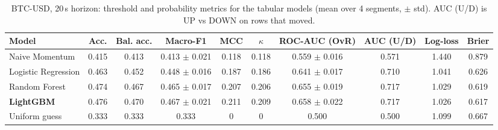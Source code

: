 \begin{table}[H]
\centering\scriptsize
\setlength{\tabcolsep}{3.5pt}
\caption{BTC-USD, 20\,s horizon: threshold and probability metrics for the tabular models (mean over 4 segments, $\pm$ std). AUC (U/D) is UP vs DOWN on rows that moved.}
\label{tab:btc_auc}
\begin{tabular}{@{}lccccccccc@{}}
\toprule
\textbf{Model} & \textbf{Acc.} & \textbf{Bal. acc.} & \textbf{Macro-F1} & \textbf{MCC} & \textbf{$\kappa$} & \textbf{ROC-AUC (OvR)} & \textbf{AUC (U/D)} & \textbf{Log-loss} & \textbf{Brier} \\
\midrule
Naive Momentum & 0.415 & 0.413 & 0.413 $\pm$ 0.021 & 0.118 & 0.118 & 0.559 $\pm$ 0.016 & 0.571 & 1.440 & 0.879 \\
Logistic Regression & 0.463 & 0.452 & 0.448 $\pm$ 0.016 & 0.187 & 0.186 & 0.641 $\pm$ 0.017 & 0.710 & 1.041 & 0.626 \\
Random Forest & 0.474 & 0.467 & 0.465 $\pm$ 0.017 & 0.207 & 0.206 & 0.655 $\pm$ 0.019 & 0.717 & 1.029 & 0.619 \\
\textbf{LightGBM} & 0.476 & 0.470 & 0.467 $\pm$ 0.021 & 0.211 & 0.209 & 0.658 $\pm$ 0.022 & 0.717 & 1.026 & 0.617 \\
\midrule
Uniform guess & 0.333 & 0.333 & 0.333 & 0 & 0 & 0.500 & 0.500 & 1.099 & 0.667 \\
\bottomrule
\end{tabular}
\end{table}
